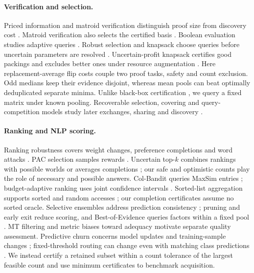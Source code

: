 \documentclass[11pt]{article}
\begin{document}
\paragraph{Verification and selection.}
Priced information and matroid verification distinguish proof size from discovery cost \citep{charikar2002priced,diwan2026basis}. Matroid verification also selects the certified basis \citep{diwan2026basis}. Boolean evaluation studies adaptive queries \citep{deshpande2016sbfe,gkenosis2018ssclass}. Robust selection and knapsack choose queries before uncertain parameters are resolved \citep{chen2026selection,goerigk2015robustqueries}. Uncertain-profit knapsack certifies good packings and excludes better ones under resource augmentation \citep{schloter2025knapsack}. Here replacement-average flip costs couple two proof tasks, safety and count exclusion. Odd medians keep their evidence disjoint, whereas mean pools can beat optimally deduplicated separate minima. Unlike black-box certification \citep{blanc2022certification,gupta2022monotone}, we query a fixed matrix under known pooling. Recoverable selection, covering and query-competition models study later exchanges, sharing and discovery \citep{chassein2017recoverabletwostagerobustselection,megow2023set,erlebach2015survey,erlebach2021parallel}.

\paragraph{Ranking and NLP scoring.}
Ranking robustness covers weight changes, preference completions and word attacks \citep{asudeh2018stable,imber2020topk,wu2022certdr}. PAC selection samples rewards \citep{kalyanakrishnan2012pac}. Uncertain top-$k$ combines rankings with possible worlds or averages completions \citep{soliman2007topk,amarilli2017topk}; our safe and optimistic counts play the role of necessary and possible answers. Col-Bandit queries MaxSim entries \citep{pony2026colbanditquerytimetopkestimation}; budget-adaptive ranking uses joint confidence intervals \citep{oettershagen2026topkbudgetadaptiveranking}. Sorted-list aggregation supports sorted and random accesses \citep{fagin2003optimal}; our completion certificates assume no sorted oracle. Selective ensembles address prediction consistency \citep{black2022selective}; pruning and early exit reduce scoring, and Best-of-Evidence queries factors within a fixed pool \citep{li2022pruning,inoue2019ensemble,busolin2021exit,zhang2026bestofevidencebestofnselectionpartial}. MT filtering \citep{perrella-etal-2024-beyond} and metric biases toward adequacy \citep{shayegh-etal-2025-feeding} motivate separate quality assessment. Predictive churn concerns model updates and training-sample changes \citep{watsondaniels2025predictive,prastalo2026reducing}; fixed-threshold routing can change even with matching class predictions \citep{kim2026lottery}. We instead certify a retained subset within a count tolerance of the largest feasible count and use minimum certificates to benchmark acquisition.
\end{document}
